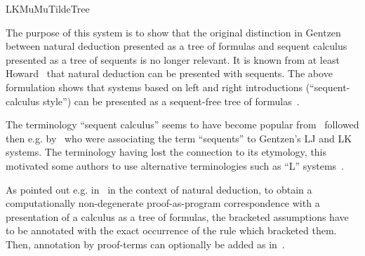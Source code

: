 \begin{entry}{LKMuMuTildeTree}
\begin{history}
The purpose of this system is to show that the original distinction in
Gentzen~\cite{Gentzen1935} between natural deduction presented as a
tree of formulas and sequent calculus presented as a tree of sequents
is no longer relevant. It is known from at least
Howard~\cite{Howard80} that natural deduction can be presented with
sequents. The above formulation shows that systems based on left and
right introductions (``sequent-calculus style'') can be presented as a
sequent-free tree of formulas~\cite{HerbelinHdR}.

The terminology ``sequent calculus'' seems to have become popular
from~\cite{Prawitz65} followed then e.g. by~\cite{Troelstra73} who
were associating the term ``sequents'' to Gentzen's LJ and LK systems.
The terminology having lost the connection to its
etymology, this motivated some authors to use alternative
terminologies such as ``L'' systems~\cite{Munch-Maccagnoni09}.
\end{history}

\begin{technicalities}
As pointed out e.g. in~\cite{GeuversPhD} in the context of natural
deduction, to obtain a computationally non-degenerate proof-as-program
correspondence with a presentation of a calculus as a tree of
formulas, the bracketed assumptions have to be annotated with the
exact occurrence of the rule which bracketed them. Then, annotation by
proof-terms can optionally be added as in~.
\end{technicalities}

\end{entry}
